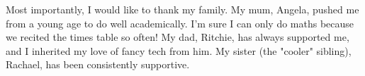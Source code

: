 Most importantly, I would like to thank my family. My mum, Angela, pushed me from a young age to do well academically. I'm sure I can only do maths because we recited the times table so often! My dad, Ritchie, has always supported me, and I inherited my love of fancy tech from him. My sister (the "cooler" sibling), Rachael, has been consistently supportive.%